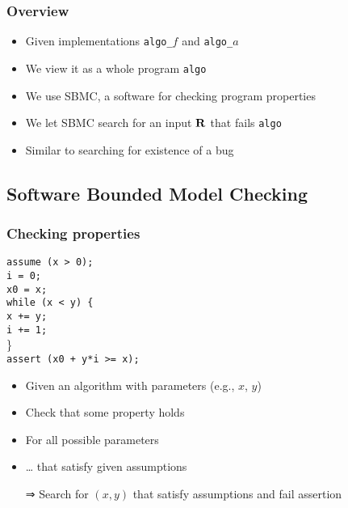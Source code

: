 \documentclass[french,english]{beamer}
\begin{document}
\begin{frame}
	\frametitle{Overview}
	\begin{itemize}
		\item Given implementations \texttt{algo\_$f$} and \texttt{algo\_$a$}
	\end{itemize}
	\centering
	\begin{itemize}
		\item We view it as a whole program \texttt{algo}
		\item We use SBMC, a software for checking program properties
		\item We let SBMC search for an input $\mathbf{R}$ that fails \texttt{algo}
		\item Similar to searching for existence of a bug
	\end{itemize}
\end{frame}

\subsection{Software Bounded Model Checking}
\begin{frame}
	\frametitle{Checking properties}
		\texttt{assume (x > 0);}\\
		\texttt{i = 0;}\\
		\texttt{x0 = x;}\\
		\texttt{while (x < y) \{}\\
		\texttt{x += y;}\\
		\texttt{i += 1;}\\
		\}\\
		\texttt{assert (x0 + y*i >= x);}
%		
	\begin{itemize}
		\item Given an algorithm with parameters (e.g., $x$, $y$)
		\item Check that some property holds
		\item For all possible parameters
		\item … that satisfy given assumptions
		\item[⇒] Search for $(x, y)$ that satisfy assumptions and fail assertion
	\end{itemize}
\end{frame}
\end{document}
